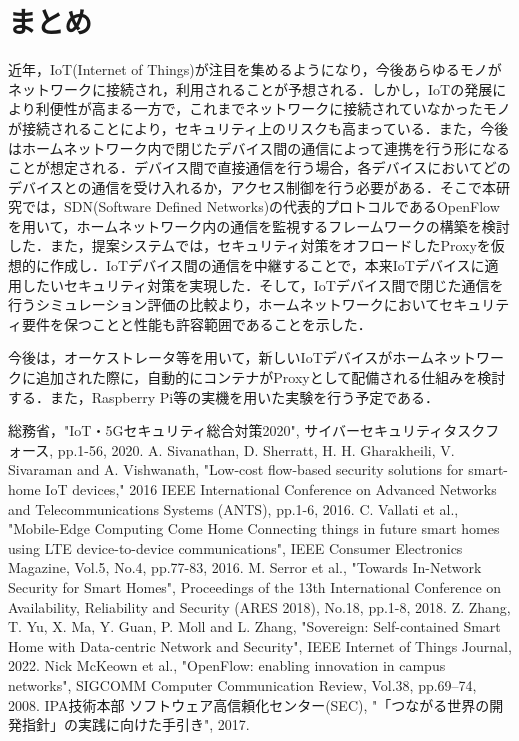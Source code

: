 \documentclass[Japanese]{dicomopapers}
\begin{document}
\section{まとめ}
近年，IoT(Internet of Things)が注目を集めるようになり，今後あらゆるモノがネットワークに接続され，利用されることが予想される．しかし，IoTの発展により利便性が高まる一方で，これまでネットワークに接続されていなかったモノが接続されることにより，セキュリティ上のリスクも高まっている．また，今後はホームネットワーク内で閉じたデバイス間の通信によって連携を行う形になることが想定される．デバイス間で直接通信を行う場合，各デバイスにおいてどのデバイスとの通信を受け入れるか，アクセス制御を行う必要がある．そこで本研究では，SDN(Software Defined Networks)の代表的プロトコルであるOpenFlowを用いて，ホームネットワーク内の通信を監視するフレームワークの構築を検討した．また，提案システムでは，セキュリティ対策をオフロードしたProxyを仮想的に作成し．IoTデバイス間の通信を中継することで，本来IoTデバイスに適用したいセキュリティ対策を実現した．そして，IoTデバイス間で閉じた通信を行うシミュレーション評価の比較より，ホームネットワークにおいてセキュリティ要件を保つことと性能も許容範囲であることを示した．\par
今後は，オーケストレータ等を用いて，新しいIoTデバイスがホームネットワークに追加された際に，自動的にコンテナがProxyとして配備される仕組みを検討する．また，Raspberry Pi等の実機を用いた実験を行う予定である．

\begin{thebibliography}{10}
	 総務省，"IoT・5Gセキュリティ総合対策2020", サイバーセキュリティタスクフォース, pp.1-56, 2020.
	 A. Sivanathan, D. Sherratt, H. H. Gharakheili, V. Sivaraman and A. Vishwanath, "Low-cost flow-based security solutions for smart-home IoT devices," 2016 IEEE International Conference on Advanced Networks and Telecommunications Systems (ANTS), pp.1-6, 2016.
	 C. Vallati et al., "Mobile-Edge Computing Come Home Connecting things in future smart homes using LTE device-to-device communications", IEEE Consumer Electronics Magazine, Vol.5, No.4, pp.77-83, 2016.
	 M. Serror et al., "Towards In-Network Security for Smart Homes", Proceedings of the 13th International Conference on Availability, Reliability and Security (ARES 2018), No.18, pp.1-8, 2018.
	 Z. Zhang, T. Yu, X. Ma, Y. Guan, P. Moll and L. Zhang, "Sovereign: Self-contained Smart Home with Data-centric Network and Security", IEEE Internet of Things Journal, 2022.
	 Nick McKeown et al., "OpenFlow: enabling innovation in campus networks", SIGCOMM Computer Communication Review, Vol.38, pp.69–74, 2008.
	 IPA技術本部 ソフトウェア高信頼化センター(SEC), "「つながる世界の開発指針」の実践に向けた手引き", 2017.
\end{thebibliography}
\end{document}
